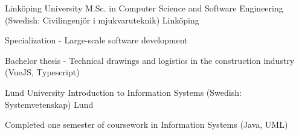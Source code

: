
\begin{cventries}

\cventry
    {Linköping University} %
    {M.Sc. in Computer Science and Software Engineering (Swedish: Civilingenjör i mjukvaruteknik)} %
    {Linköping} %
    {} %
    {
      \begin{cvitems} %
        \item {Specialization - Large-scale software development}
        \item {Bachelor thesis - Technical drawings and logistics in the construction industry (VueJS, Typescript)}
      \end{cvitems}
    }

\cventry
    {Lund University} %
    {Introduction to Information Systems (Swedish: Systemvetenskap)} %
    {Lund} %
    {} %
    {
      \begin{cvitems} %
        \item {Completed one semester of coursework in Information Systems (Java, UML)}
      \end{cvitems}
    }
\end{cventries}
